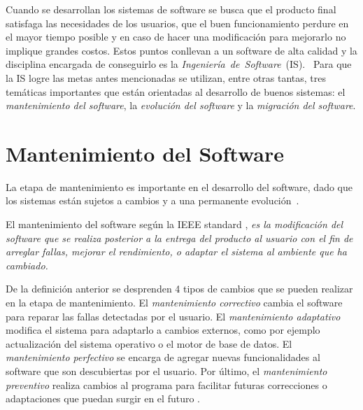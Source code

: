 
Cuando se desarrollan los sistemas de software se busca que el producto final satisfaga las necesidades de los usuarios, que el buen funcionamiento perdure en el mayor tiempo posible y en caso de hacer una modificación para mejorarlo no implique grandes costos. Estos puntos conllevan a un software de alta calidad y la disciplina encargada de conseguirlo es la \mbox{\textit{Ingeniería de Software} (IS). }%
Para que la IS logre las metas antes mencionadas se utilizan, entre otras tantas, tres temáticas importantes que están orientadas al desarrollo de buenos sistemas: el \textit{mantenimiento del software}, la \textit{evolución del software} y la \textit{migración del software}. 

\section{Mantenimiento del Software}

La etapa de mantenimiento es importante en el desarrollo del software, dado que los sistemas están sujetos a cambios y a una permanente \mbox{evolución \cite{PFT02}.}

El mantenimiento del software según la IEEE standard \cite{STD610}, \textit{es la mo\-dificación del software que se realiza posterior a la entrega del producto al usuario con el fin de arreglar fallas, mejorar el rendimiento, o adaptar el sistema al ambiente que ha cambiado.}

De la definición anterior se desprenden 4 tipos de cambios que se pueden realizar en la etapa de mantenimiento. El \textit{mantenimiento correctivo} cambia el software para reparar las fallas detectadas por el usuario. El \textit{mantenimiento adaptativo} modifica el sistema para adaptarlo a cambios externos, como por ejemplo actualización del sistema operativo o el motor de base de datos. El \textit{mantenimiento perfectivo} se encarga de agregar nuevas funcionalidades al software que son descubiertas por el usuario. Por último, el \textit{mantenimiento preventivo} realiza cambios al programa para facilitar futuras correcciones o adaptaciones que puedan surgir en el futuro \cite{RSPMGH02}.


